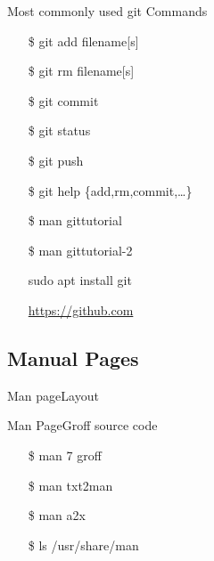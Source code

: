 \begin{frame}
  \begin{block}{Most commonly used git Commands}\ttfamily
    \begin{itemize}
    \item[\$] git add filename[s]
    \item[\$] git rm filename[s]
    \item[\$] git commit
    \item[\$] git status\qquad{}\qquad{}
    \item[\$] git push\qquad{}
    \item[\$] git help \{add,rm,commit,\ldots\}
    \end{itemize}
  \end{block}
  \begin{multicols}{2}
    \begin{itemize}
    \item[\$] man gittutorial
    \item[\$] man gittutorial-2
    \item[\debian] sudo apt install git
    \item[\github] \url{https://github.com}
    \end{itemize}
  \end{multicols}
\end{frame}

\subsection{Manual Pages}
\label{sec:manual-pages}

\begin{frame}{Man page}{Layout}
  \begin{center}
  \end{center}
\end{frame}

\begin{frame}{Man Page}{Groff source code}
  \begin{minipage}[b]{.6\linewidth}
    \begin{center}
    \end{center}
  \end{minipage}
  \begin{minipage}[b]{.35\linewidth}\ttfamily
    \begin{itemize}
    \item[\$] man 7 groff
    \item[\$] man txt2man
    \item[\$] man a2x
    \item[\$] ls /usr/share/man
    \end{itemize}
  \end{minipage}
\end{frame}

